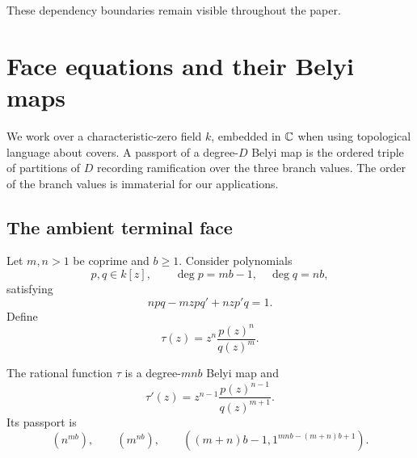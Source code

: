 \documentclass[11pt,reqno]{amsart}
\begin{document}
These dependency boundaries remain visible throughout the paper.

\section{Face equations and their Belyi maps}
\label{sec:faces}

We work over a characteristic-zero field \(k\), embedded in \(\mathbb C\) when
using topological language about covers.  A passport of a degree-\(D\)
Belyi map is the ordered triple of partitions of \(D\) recording
ramification over the three branch values.  The order of the branch values
is immaterial for our applications.

\subsection{The ambient terminal face}

Let \(m,n>1\) be coprime and \(b\ge1\).  Consider polynomials
\[
p,q\in k[z],\qquad
\deg p=mb-1,\quad \deg q=nb,
\]
satisfying
\begin{equation}
\label{eq:ambient-ode}
npq-mzpq'+nzp'q=1.
\end{equation}
Define
\begin{equation}
\label{eq:ambient-tau}
\tau(z)=z^n\frac{p(z)^n}{q(z)^m}.
\end{equation}

\begin{proposition}
\label{prop:ambient-passport}
The rational function \(\tau\) is a degree-\(mnb\) Belyi map and
\begin{equation}
\label{eq:ambient-derivative}
\tau'(z)=z^{n-1}\frac{p(z)^{n-1}}{q(z)^{m+1}}.
\end{equation}
Its passport is
\begin{equation}
\label{eq:ambient-passport}
\left(n^{mb}\right),\qquad
\left(m^{nb}\right),\qquad
\left((m+n)b-1,1^{mnb-(m+n)b+1}\right).
\end{equation}
\end{proposition}
\end{document}
